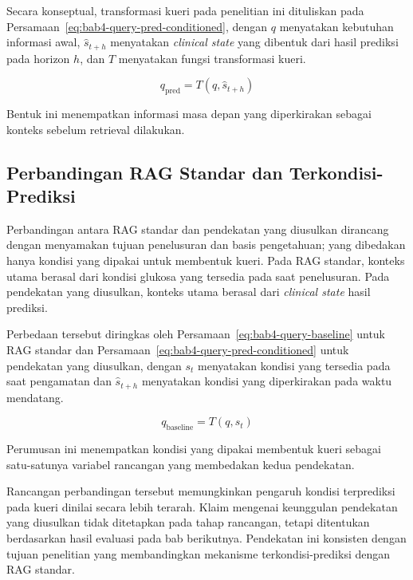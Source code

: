 Secara konseptual, transformasi kueri pada penelitian ini dituliskan pada Persamaan~\ref{eq:bab4-query-pred-conditioned}, dengan $q$ menyatakan kebutuhan informasi awal, $\hat{s}_{t+h}$ menyatakan \textit{clinical state} yang dibentuk dari hasil prediksi pada horizon $h$, dan $T$ menyatakan fungsi transformasi kueri.

\begin{equation} q_{\mathrm{pred}} = T(q,\hat{s}_{t+h})
    \label{eq:bab4-query-pred-conditioned}
\end{equation}

Bentuk ini menempatkan informasi masa depan yang diperkirakan sebagai konteks sebelum retrieval dilakukan.

\subsection{Perbandingan RAG Standar dan Terkondisi-Prediksi} 
\label{subsec:bab4-perbandingan-rag}

Perbandingan antara RAG standar dan pendekatan yang diusulkan dirancang dengan menyamakan tujuan penelusuran dan basis pengetahuan; yang dibedakan hanya kondisi yang dipakai
untuk membentuk kueri. Pada RAG standar, konteks utama berasal dari kondisi glukosa yang tersedia pada saat penelusuran. Pada pendekatan yang diusulkan, konteks utama berasal dari \textit{clinical state} hasil
prediksi.

Perbedaan tersebut diringkas oleh Persamaan~\ref{eq:bab4-query-baseline} untuk RAG standar dan Persamaan~\ref{eq:bab4-query-pred-conditioned} untuk pendekatan yang diusulkan, dengan $s_t$ menyatakan kondisi yang tersedia pada saat pengamatan dan $\hat{s}_{t+h}$ menyatakan kondisi yang diperkirakan pada waktu mendatang.

\begin{equation} q_{\mathrm{baseline}} = T(q,s_t)
    \label{eq:bab4-query-baseline}
\end{equation}

Perumusan ini menempatkan kondisi yang dipakai membentuk kueri sebagai satu-satunya variabel rancangan yang membedakan kedua pendekatan.

Rancangan perbandingan tersebut memungkinkan pengaruh kondisi terprediksi pada kueri dinilai secara lebih terarah. Klaim mengenai keunggulan pendekatan yang diusulkan tidak ditetapkan pada tahap
rancangan, tetapi ditentukan berdasarkan hasil evaluasi pada bab berikutnya. Pendekatan ini konsisten dengan tujuan penelitian yang membandingkan mekanisme terkondisi-prediksi dengan
RAG standar.

